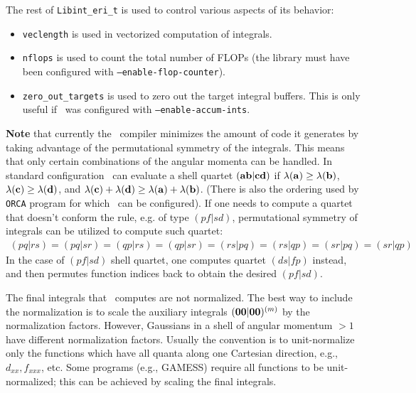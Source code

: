 \documentclass[10pt]{article}
\begin{document}
The rest of {\tt Libint\_eri\_t} is used to control various aspects of its behavior:
\begin{itemize}
\item {\tt veclength} is used in vectorized computation of integrals.
\item {\tt nflops} is used to count the total number of FLOPs (the library must have been configured
  with {\tt --enable-flop-counter}).
\item {\tt zero\_out\_targets} is used to zero out the target integral buffers. This is only useful
  if \LIBINT\ was configured with {\tt --enable-accum-ints}.
\end{itemize}

{\bf Note} that currently the \LIBINT\ compiler minimizes the amount of code it
generates by taking advantage of the permutational symmetry of the integrals.
This means that only certain combinations of the angular momenta can be handled.
In standard configuration \LIBINT\ can evaluate a shell quartet $({\bf ab}|{\bf cd})$ if $\lambda({\bf a}) \geq \lambda({\bf b})$, $\lambda({\bf c}) \geq \lambda({\bf d})$, and $\lambda({\bf c}) + \lambda({\bf d}) \geq \lambda({\bf a}) + \lambda({\bf b})$.
(There is also the ordering used by {\tt ORCA} program for which \LIBINT\ can be
configured). If one needs to compute a quartet that doesn't conform the rule,
e.g. of type $(pf|sd)$, permutational symmetry of integrals can be utilized to compute such quartet:
\begin{eqnarray}
(pq|rs) = (pq|sr) = (qp|rs) = (qp|sr) = (rs|pq) = (rs|qp)= (sr|pq) = (sr|qp)
\end{eqnarray}
In the case of $(pf|sd)$ shell quartet, one computes quartet $(ds|fp)$ instead, and then
permutes function indices back to obtain the desired $(pf|sd)$.

The final integrals that \LIBINT\ computes are not normalized. The best way to include the normalization
is to scale the auxiliary integrals $({\bf 00}|{\bf 00})^{(m)}$ by the normalization factors.
However, Gaussians in a shell of angular momentum $>1$ have different normalization factors.
Usually the convention is to unit-normalize only the functions which have all
quanta along one Cartesian direction, e.g., $d_{xx}, f_{xxx}$, etc. Some
programs (e.g., GAMESS) require all functions to be unit-normalized;
this can be achieved by scaling the final integrals.
\end{document}
